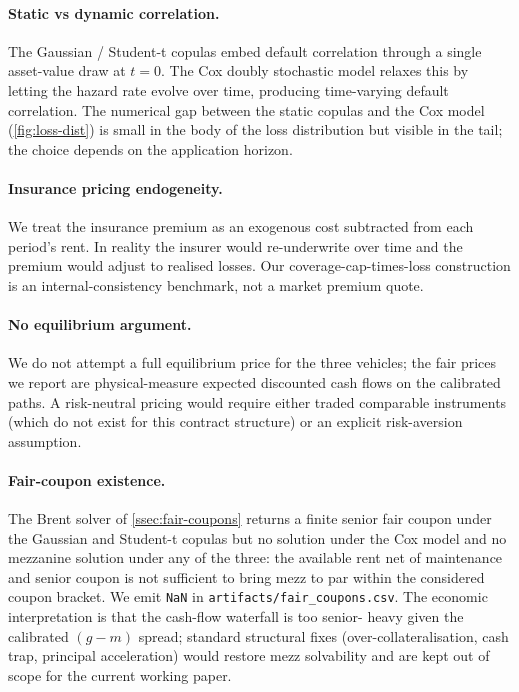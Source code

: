\paragraph{Static vs dynamic correlation.}
The Gaussian / Student-t copulas embed default correlation through a
single asset-value draw at $t = 0$. The Cox doubly stochastic model
relaxes this by letting the hazard rate evolve over time, producing
time-varying default correlation. The numerical gap between the static
copulas and the Cox model (\cref{fig:loss-dist}) is small in the body
of the loss distribution but visible in the tail; the choice depends
on the application horizon.

\paragraph{Insurance pricing endogeneity.}
We treat the insurance premium as an exogenous cost subtracted from each
period's rent. In reality the insurer would re-underwrite over time and
the premium would adjust to realised losses. Our coverage-cap-times-loss
construction is an internal-consistency benchmark, not a market premium
quote.

\paragraph{No equilibrium argument.}
We do not attempt a full equilibrium price for the three vehicles; the
fair prices we report are physical-measure expected discounted cash flows
on the calibrated paths. A risk-neutral pricing would require either
traded comparable instruments (which do not exist for this contract
structure) or an explicit risk-aversion assumption.

\paragraph{Fair-coupon existence.}
The Brent solver of \cref{ssec:fair-coupons} returns a finite senior
fair coupon under the Gaussian and Student-t copulas but no solution
under the Cox model and no mezzanine solution under any of the three:
the available rent net of maintenance and senior coupon is not
sufficient to bring mezz to par within the considered coupon bracket.
We emit \texttt{NaN} in \texttt{artifacts/fair\_coupons.csv}. The
economic interpretation is that the cash-flow waterfall is too senior-
heavy given the calibrated $(g - m)$ spread; standard structural fixes
(over-collateralisation, cash trap, principal acceleration) would
restore mezz solvability and are kept out of scope for the current
working paper.

